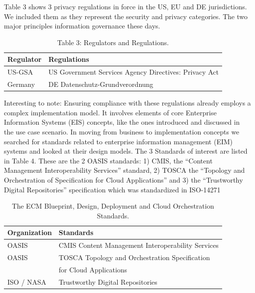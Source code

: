 \documentclass[a4paper,twoside]{article}
\begin{document}
%
Table 3 shows 3 privacy regulations in force in the US, EU and DE jurisdictions. We included them as they represent the security and privacy categories. The two major principles information governance these days. 
%
\begin{table}[ht]
\caption{Table 3: Regulators and Regulations.}
\label{tab:regulations} \centering
 \scalebox{0.55} {\begin{tabular}{|l|l|}
 \hline
  {Regulator} & {Regulations}\\
  \hline
  {US-GSA} & {US Government Services Agency Directives: Privacy Act \cite{USGSA}}\\
  \hline
  {Germany} & {DE Datenschutz-Grundverordnung} \\
  \hline 
 \end{tabular}}
\end{table}
%
Interesting to note: Ensuring compliance with these regulations already employs a complex implementation model. It involves elements of core Enterprise Information Systems (EIS) concepts, like the ones introduced and discussed in the use case scenario. 
In moving from business to implementation concepts we searched for standards related to enterprise information management (EIM) systems and looked at their design models. The 3 Standards of interest are listed in Table 4. These are the 2 OASIS standards: 1) CMIS, the “Content Management Interoperability Services” standard, 2) TOSCA the “Topology and Orchestration of Specification for Cloud Applications” and 3) the “Trustworthy Digital Repositories” specification which was standardized in ISO-14271
\begin{table}[ht]
\caption{The ECM Blueprint, Design, Deployment and Cloud Orchestration Standards.}
\label{tab:blueprint} \centering
 \scalebox{0.55} {\begin{tabular}{|l|l|}
 \hline
  {Organization} & {Standards}\\
  \hline
  {OASIS} & {CMIS Content Management Interoperability Services \cite{CMIS2015}}\\
  \hline
  {OASIS} & {TOSCA Topology and Orchestration Specification } \\
  {} & { for Cloud Applications \cite{TOSCA2022}} \\  
  \hline 
  {ISO / NASA} & { Trustworthy Digital Repositories \cite{ISO14721-2017}}\\
  \hline
 \end{tabular}}
\end{table}
\end{document}
